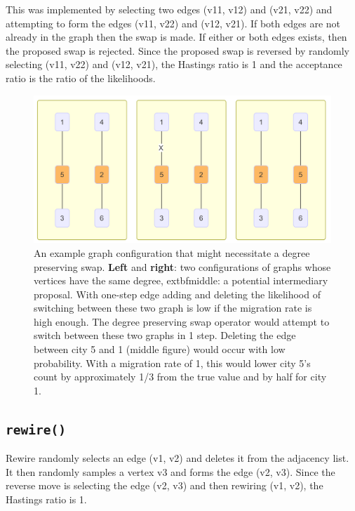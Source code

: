 \documentclass[11pt,a4paper]{article}
\numberwithin{equation}{section}
\begin{document}
This was implemented by selecting two edges (v11, v12) and (v21, v22)
and attempting to form the edges (v11, v22) and (v12, v21). If both
edges are not already in the graph then the swap is made. If either or
both edges exists, then the proposed swap is rejected. Since the
proposed swap is reversed by randomly selecting (v11, v22) and (v12,
v21), the Hastings ratio is 1 and the acceptance ratio is the ratio of
the likelihoods.

\begin{figure}

{\centering \includegraphics[width=0.75\linewidth]{degree_pre_diag} 

}

\caption{\label{fig:deg_pre}  An example graph configuration that might necessitate a degree preserving swap. \textbf{Left} and \textbf{right}: two configurations of graphs whose vertices have the same degree,     extbf{middle}: a potential intermediary proposal. With one-step edge adding and deleting the likelihood of switching between these two graph is low if the migration rate is high enough. The degree preserving swap operator would attempt to switch between these two graphs in 1 step. Deleting the edge between city 5 and 1 (middle figure) would occur with low probability. With a migration rate of 1, this would lower city 5's count by approximately 1/3 from the true value and by half for city 1.}\label{fig:unnamed-chunk-2}
\end{figure}

\hypertarget{rewire}{%
\subsection{\texorpdfstring{\texttt{rewire()}}{rewire()}}\label{rewire}}

Rewire randomly selects an edge (v1, v2) and deletes it from the
adjacency list. It then randomly samples a vertex v3 and forms the edge
(v2, v3). Since the reverse move is selecting the edge (v2, v3) and then
rewiring (v1, v2), the Hastings ratio is 1.
\end{document}
